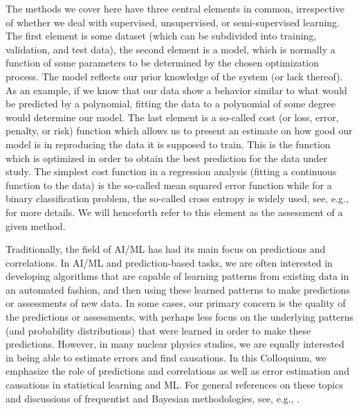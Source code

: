 \documentclass[../../main/main.tex]{subfiles}
\begin{document}
The methods we cover here have three central elements in common,
irrespective of whether we deal with supervised, unsupervised, or
semi-supervised learning. The first element is some dataset (which can
be subdivided into training, validation, and test data), the second
element is a model, which is normally a function of some parameters to
be determined by the chosen optimization process. The model reflects
our prior knowledge of the system (or lack thereof). As an example, if
we know that our data show a behavior similar to what would be
predicted by a polynomial, fitting the data to a polynomial of some
degree would determine our model.  The last element is a so-called
cost (or loss, error, penalty, or risk) function which allows us to
present an estimate on how good our model is in reproducing the data
it is supposed to train. This is the function which is optimized in
order to obtain the best prediction for the data under study. The
simplest cost function in a regression analysis (fitting a continuous
function to the data) is the so-called mean squared error function
while for a binary classification problem, the so-called cross entropy
is widely used, see, e.g., \cite{Murphy2012,Bishop2006,Hastie2009} for
more details. We will henceforth refer to this element as the
assessment of a given method.


 
Traditionally, the field of AI/ML has had its main focus on
predictions and correlations.  In AI/ML and prediction-based tasks, we
are often interested in developing algorithms that are capable of
learning patterns from existing data in an automated fashion, and then
using these learned patterns to make predictions or assessments of new
data. In some cases, our primary concern is the quality of the
predictions or assessments, with perhaps less focus on the underlying
patterns (and probability distributions) that were learned in order to
make these predictions.  However, in many nuclear physics studies, we
are equally interested in being able to estimate errors and find
causations.  In this Colloquium, we emphasize the role of predictions
and correlations as well as error estimation and causations in
statistical learning and ML.  For general references on these topics
and discussions of frequentist and Bayesian methodologies, see, e.g.,
\cite{Bishop2006, Goodfellow2016, Murphy2012, Hastie2009}.
\end{document}
